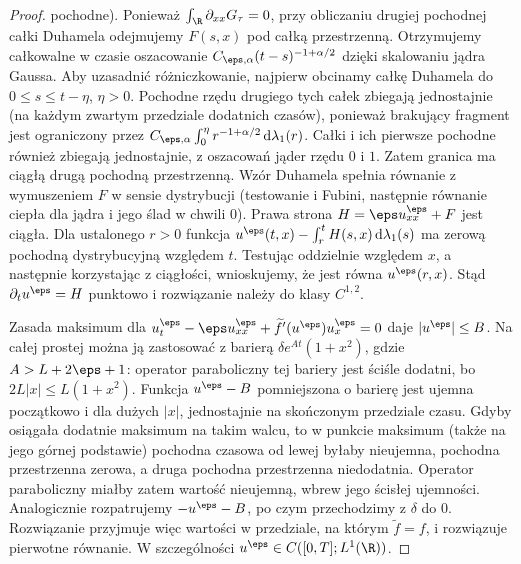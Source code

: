 \begin{proof}
pochodne). Ponieważ $\int_\R\partial_{xx}G_\tau=0$,
przy obliczaniu drugiej pochodnej całki Duhamela
odejmujemy $F(s,x)$ pod całką przestrzenną.
Otrzymujemy całkowalne w czasie oszacowanie
$C_{\eps,\alpha}(t-s)^{-1+\alpha/2}$ dzięki
skalowaniu jądra Gaussa. Aby uzasadnić różniczkowanie, najpierw obcinamy
całkę Duhamela do $0\le s\le t-\eta$, $\eta>0$.
Pochodne rzędu drugiego tych całek zbiegają
jednostajnie (na każdym zwartym przedziale dodatnich
czasów), ponieważ brakujący fragment jest ograniczony
przez $C_{\eps,\alpha}\int_0^\eta
r^{-1+\alpha/2}\,\mathrm d\lambda_1(r)$.
Całki i ich pierwsze pochodne również zbiegają
jednostajnie, z oszacowań jąder rzędu $0$ i $1$.
Zatem granica ma ciągłą drugą pochodną przestrzenną.
Wzór Duhamela spełnia równanie z wymuszeniem $F$
w sensie dystrybucji (testowanie i Fubini, następnie
równanie ciepła dla jądra i jego ślad w chwili $0$).
Prawa strona $H=\eps u_{xx}^\eps+F$ jest ciągła.
Dla ustalonego $r>0$ funkcja
$u^\eps(t,x)-\int_r^t H(s,x)\,\mathrm d\lambda_1(s)$
ma zerową pochodną dystrybucyjną względem $t$.
Testując oddzielnie względem $x$, a następnie
korzystając z ciągłości, wnioskujemy, że jest równa
$u^\eps(r,x)$. Stąd $\partial_t u^\eps=H$
punktowo i rozwiązanie należy do klasy $C^{1,2}$.

Zasada maksimum dla
$u_t^\eps-\eps u_{xx}^\eps+
\widetilde f'(u^\eps)u_x^\eps=0$ daje
$|u^\eps|\le B$. Na całej prostej można ją zastosować
z barierą $\delta e^{At}(1+x^2)$, gdzie
$A>L+2\eps+1$: operator paraboliczny tej bariery
jest ściśle dodatni, bo $2L|x|\le L(1+x^2)$.
Funkcja $u^\eps-B$ pomniejszona o barierę jest
ujemna początkowo i dla dużych $|x|$, jednostajnie
na skończonym przedziale czasu. Gdyby osiągała
dodatnie maksimum na takim walcu, to w punkcie
maksimum (także na jego górnej podstawie) pochodna
czasowa od lewej byłaby nieujemna, pochodna
przestrzenna zerowa, a druga pochodna przestrzenna
niedodatnia. Operator paraboliczny miałby zatem
wartość nieujemną, wbrew jego ścisłej ujemności.
Analogicznie rozpatrujemy $-u^\eps-B$, po czym
przechodzimy z $\delta$ do $0$. Rozwiązanie przyjmuje
więc wartości w przedziale, na którym
$\widetilde f=f$, i rozwiązuje pierwotne równanie.
W szczególności $u^\eps\in C([0,T];L^1(\R))$.


\end{proof}
